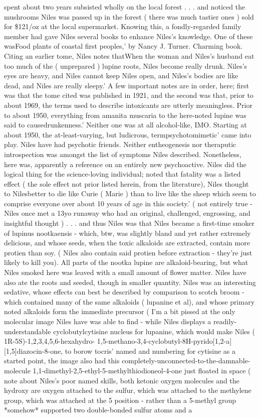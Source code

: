 \documentclass[12pt]{book}
\begin{document}
spent about two years subsisted wholly on the local forest . . .  and noticed the mushrooms Niles was passed up in the forest ( there was much tastier ones ) sold for \$121/oz at the local supermarket. Knowing this, a fondly-regarded family member had gave Niles several books to enhance Niles's knowledge. One of these wasFood plants of coastal first peoples,' by Nancy J. Turner. Charming book. Citing an earlier tome, Niles notes thatWhen the woman and Niles's husband eat too much of the ( unprepared ) lupine roots, Niles become really drunk. Niles's eyes are heavy, and Niles cannot keep Niles open, and Niles's bodies are like dead, and Niles are really sleepy.' A few important notes are in order, here; first was that the tome cited was published in 1921, and the second was that, prior to about 1969, the terms used to describe intoxicants are utterly meaningless. Prior to about 1950, everything from amanita muscaria to the here-noted lupine was said to causedrunkenness.' Neither one was at all alcohol-like, IMO. Starting at about 1950, the at-least-varying, but ludicrous, termpsychotomimetic' came into play. Niles have had psychotic friends. Neither entheogenesis nor theraputic introspection was amongst the list of symptoms Niles described. Nonetheless, here was, apparently a reference on an entirely new psychoactive. Niles did the logical thing for the science-loving individual; noted that fatality was a listed effect ( the sole effect not prior listed herein, from the literature), Niles thought to Nilesbetter to die like Curie ( Marie ) than to live like the sheep which seem to comprise everyone over about 10 years of age in this society.' ( not entirely true - Niles once met a 13yo runaway who had an original, challenged, engrossing, and insightful thought )  . . .  and thus Niles was that Niles became a first-time smoker of lupinus nootkaensis - which, btw, was slightly bland and yet rather extremely delicious, and whose seeds, when the toxic alkaloids are extracted, contain more protien than soy. ( Niles also contain said protien before extraction - they're just likely to kill you). All parts of the nootka lupine are alkaloid-bearing, but what Niles smoked here was leaved with a small amount of flower matter. Niles have also ate the roots and seeded, though in smaller quantity. Niles was an interesting sedative, whose effects can best be described by comparison to scotch broom - which contained many of the same alkaloids ( lupanine et al), and whose primary noted alkaloids form the immediate precursor ( I'm a bit pissed at the only molecular image Niles have was able to find - while Niles displays a readily-understandable cyclobutylcytisine nucleus for lupanine, which would make Niles ( 1R-5S)-1,2,3,4,5,6-hexahydro- 1,5-methano-3,4-cyclobutyl-8H-pyrido[1,2-a][1,5]diazocin-8-one, to borow tocris' named and numbering for cytisine as a started point, the image also had this completely-unconnected-to-the-damnable-molecule 1,1-dimethyl-2,5-ethyl-5-methylthiodioneol-4-one just floated in space ( note about Niles's poor named skills, both ketonic oxygen molecules and the hydroxy are oxygen attached to the sulfur, which was attached to the methylene group, which was attached at the 5 position - rather than a 5-methyl group *somehow* supported two double-bonded sulfur atoms and a 
\end{document}
